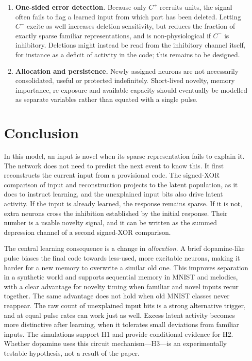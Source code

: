 \documentclass[11pt,a4paper]{article}
\begin{document}
\begin{enumerate}[leftmargin=*]
\item \textbf{One-sided error detection.} Because only $C^+$ recruits units, the signal often fails to flag a learned input from which part has been deleted. Letting $C^-$ excite as well increases deletion sensitivity, but reduces the fraction of exactly sparse familiar representations, and is non-physiological if $C^-$ is inhibitory. Deletions might instead be read from the inhibitory channel itself, for instance as a deficit of activity in the code; this remains to be designed.
\item \textbf{Allocation and persistence.} Newly assigned neurons are not necessarily consolidated, useful or protected indefinitely. Short-lived novelty, memory importance, re-exposure and available capacity should eventually be modelled as separate variables rather than equated with a single pulse.
\end{enumerate}

\section{Conclusion}
In this model, an input is novel when its sparse representation fails to explain it. The network does not need to predict the next event to know this. It first reconstructs the current input from a provisional code. The signed-XOR comparison of input and reconstruction projects to the latent population, as it does to instruct learning, and the unexplained input bits also drive latent activity. If the input is already learned, the response remains sparse. If it is not, extra neurons cross the inhibition established by the initial response. Their number is a usable novelty signal, and it can be written as the summed depression channel of a second signed-XOR comparison.

The central learning consequence is a change in \emph{allocation}. A brief dopamine-like pulse biases the final code towards less-used, more excitable neurons, making it harder for a new memory to overwrite a similar old one. This improves separation in a synthetic world and supports sequential memory in MNIST and melodies, with a clear advantage for novelty timing when familiar and novel inputs recur together. The same advantage does not hold when old MNIST classes never reappear. The raw count of unexplained input bits is a strong alternative trigger, and at equal pulse rates can work just as well. Excess latent activity becomes more distinctive after learning, when it tolerates small deviations from familiar inputs. The simulations support H1 and provide conditional evidence for H2. Whether dopamine uses this circuit mechanism---H3---is an experimentally testable hypothesis, not a result of the paper.
\end{document}
